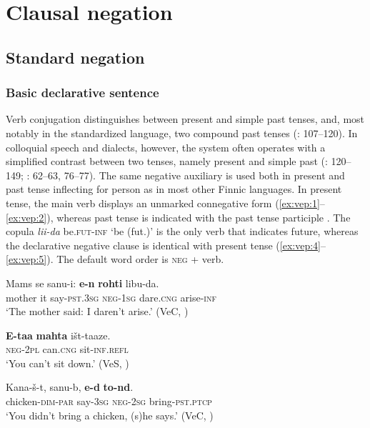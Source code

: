 \documentclass[output=paper,colorlinks=true, citecolor=brown]{langscibook}
\begin{document}
\section{Clausal negation}\label{sec:vep:2}

\subsection{Standard negation}\label{sec:vep:2.1}
\subsubsection{Basic declarative sentence}\label{sec:vep:2.1.1}

Verb conjugation distinguishes between present and simple past tenses, and, most notably in the standardized language, two compound past tenses (\citealt{Zaitseva2000, Zaitseva2001}: 107–120). In colloquial speech and dialects, however, the system often operates with a simplified contrast between two tenses, namely present and simple past (\citealt{Grünthal2015}: 120–149; \citealt{MSFOu86}: 62–63, 76–77). The same negative auxiliary is used both in present and past tense inflecting for person as in most other Finnic languages. In present tense, the main verb displays an unmarked connegative form (\ref{ex:vep:1}--\ref{ex:vep:2}), whereas past tense is indicated with the past tense participle . The copula \textit{lii-da} be.\textsc{fut-inf} ‘be (fut.)’ is the only verb that indicates future, whereas the declarative negative clause is identical with present tense (\ref{ex:vep:4}--\ref{ex:vep:5}). The default word order is \textsc{neg} + verb.

\ea
    \label{ex:vep:1}
    \gll  Mams  se  sanu{}-i:  \textbf{e{}-n} \textbf{rohti} libu-da. \\
         mother  it say-\textsc{pst.3sg} \textsc{neg-1sg} dare\textsc{.cng} arise-\textsc{inf}\\
    \glt ‘The mother said: I daren’t arise.’ (VeC, \citealt[32]{MSFOu70})
\z    

\ea
    \label{ex:vep:2}
    \gll \textbf{E-taa}   \textbf{mahta} išt-taaze. \\
         \textsc{neg{}-}2\textsc{pl}   can.\textsc{cng} sit-\textsc{inf.refl} \\
    \glt ‘You can’t sit down.’ (VeS, \citealt[116]{Kettunen1920})
\z

\ea
    \label{ex:vep:3}
    \gll Kana-š-t, sanu-b, \textbf{e-d} \textbf{to-nd}. \\
         chicken-\textsc{dim{}-par} say-\textsc{3sg}  \textsc{neg{}-2sg} bring-\textsc{pst.ptcp}\\
    \glt ‘You didn’t bring a chicken, (s)he says.’ (VeC, \citealt[92]{MSFOu70})
\z
\end{document}
